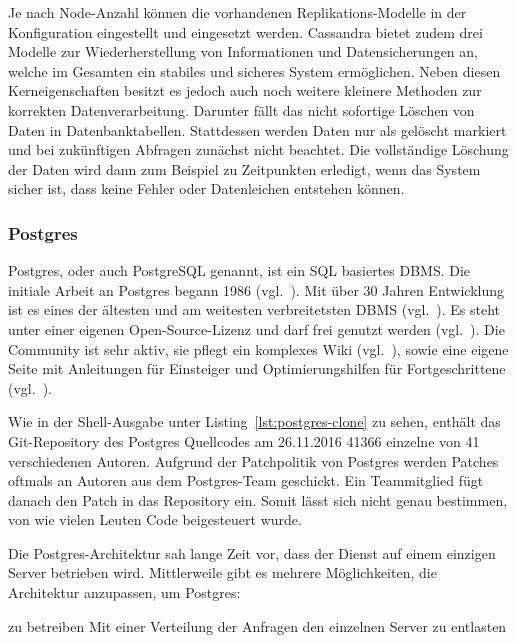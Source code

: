 Je nach Node\hyp{}Anzahl können die vorhandenen Replikations\hyp{}Modelle in
der Konfiguration eingestellt und eingesetzt werden. Cassandra bietet zudem
drei Modelle zur Wiederherstellung von Informationen und Datensicherungen an,
welche im Gesamten ein stabiles und sicheres System ermöglichen. Neben diesen
Kerneigenschaften besitzt es jedoch auch noch weitere kleinere Methoden zur
korrekten Datenverarbeitung. Darunter fällt das nicht sofortige Löschen von
Daten in Datenbanktabellen. Stattdessen werden Daten nur als gelöscht markiert
und bei zukünftigen Abfragen zunächst nicht beachtet. Die vollständige Löschung
der Daten wird dann zum Beispiel zu Zeitpunkten erledigt, wenn das System
sicher ist, dass keine Fehler oder Datenleichen entstehen können.
\nl%

\subsubsection{Postgres}
\label{subsubsec:postgres}
Postgres, oder auch PostgreSQL genannt, ist ein \gls{SQL} basiertes \gls{DBMS}.
Die initiale Arbeit an Postgres begann 1986 (vgl.~\cite{old_postgres}). Mit
über 30 Jahren Entwicklung ist es eines der ältesten und am weitesten
verbreitetsten \gls{DBMS} (vgl.~\cite{db_ranking}). Es steht unter einer
eigenen Open\hyp{}Source\hyp{}Lizenz und darf frei genutzt werden
(vgl.~\cite{postgres_license}). Die Community ist sehr aktiv, sie pflegt ein
komplexes Wiki (vgl.~\cite{postgres_wiki}), sowie eine eigene Seite mit
Anleitungen für Einsteiger und Optimierungshilfen für Fortgeschrittene
(vgl.~\cite{postgres_tutorial}).

Wie in der Shell\hyp{}Ausgabe unter Listing~\ref{lst:postgres-clone} zu sehen,
enthält das \gls{Git}-\gls{Repository} des Postgres Quellcodes am 26.11.2016
41366 einzelne  von 41 verschiedenen Autoren. Aufgrund
der Patchpolitik von Postgres werden Patches oftmals an Autoren aus dem
Postgres\hyp{}Team geschickt. Ein Teammitglied fügt danach den Patch in das
\gls{Repository} ein. Somit lässt sich nicht genau bestimmen, von wie vielen
Leuten Code beigesteuert wurde.

Die Postgres\hyp{}Architektur sah lange Zeit vor, dass der Dienst auf einem
einzigen Server betrieben wird. Mittlerweile gibt es mehrere Möglichkeiten, die
Architektur anzupassen, um Postgres:

\begin{outline}
  \1  zu betreiben
  \1 
  \1 Mit einer Verteilung der Anfragen den einzelnen Server zu entlasten
\end{outline}

